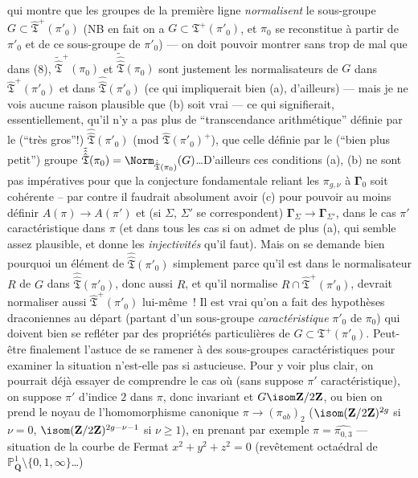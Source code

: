qui montre que les groupes de la première ligne \emph{normalisent} le sous-groupe $G\subset \hat{\mathfrak{T}}^+(\pi'_0)$ (NB en fait on a $G\subset \mathfrak{T}^+(\pi'_0)$, et $\pi_0$ se reconstitue à partir de $\pi'_0$ et de ce sous-groupe de $\pi'_0$) --- on doit pouvoir montrer sans trop de mal que dans (8), $\tilde{\hat{\mathfrak{T}}}^+(\pi_0)$ et  $\tilde{\hat{\hat{\mathfrak{T}}}}(\pi_0)$ sont justement les normalisateurs de $G$ dans $\hat{\mathfrak{T}}^+(\pi'_0)$ et dans $\hat{\hat{\mathfrak{T}}}(\pi'_0)$ (ce qui impliquerait bien (a), d'ailleurs) --- mais je ne vois aucune raison plausible que (b) soit vrai --- ce qui signifierait, essentiellement, qu'il n'y a pas plus de ``transcendance arithmétique'' définie par le (``très gros''!) $\hat{\hat{\mathfrak{T}}}(\pi'_0)$ (mod $\hat{\mathfrak{T}}(\pi'_0)^+$), que celle définie par le (``bien plus petit'') groupe $\tilde{\hat{\hat{\mathfrak{T}}}}(\pi_0)={\Norm}_{\hat{\hat{\mathfrak{T}}}(\pi_0)}(G)$\dots D'ailleurs ces conditions (a), (b) ne sont pas impératives pour que la conjecture fondamentale reliant les $\pi_{g,\nu}$ à $\boldsymbol{\Gamma}_0$ soit cohérente -- par contre il faudrait absolument avoir (c) pour pouvoir au moins définir $A(\pi)\to A(\pi')$ et (si $\Sigma$, $\Sigma'$ se correspondent) $\boldsymbol{\Gamma}_\Sigma\to\boldsymbol{\Gamma}_{\Sigma'}$, dans le cas $\pi'$ caractéristique dans $\pi$ (et dans tous les cas si on admet de plus (a), qui semble assez plausible, et donne les \emph{injectivités} qu'il faut). Mais on se demande bien pourquoi un élément de $\hat{\hat{\mathfrak{T}}}(\pi'_0)$ simplement parce qu'il est dans le normalisateur $R$ de $G$ dans $\hat{\hat{\mathfrak{T}}}(\pi'_0)$, donc aussi $R$, et qu'il normalise $R\cap\hat{\mathfrak{T}}^+(\pi'_0)$, devrait normaliser aussi $\hat{\mathfrak{T}}^+(\pi'_0)$ lui-même~! Il est vrai qu'on a fait des hypothèses draconiennes au départ (partant d'un sous-groupe \emph{caractéristique} $\pi'_0$ de $\pi_0$) qui doivent bien se refléter par des propriétés particulières de $G\subset \mathfrak{T}^+(\pi'_0)$. Peut-être finalement l'astuce de se ramener à des sous-groupes caractéristiques pour examiner la situation n'est-elle pas si astucieuse. Pour y voir plus clair, on pourrait déjà essayer de comprendre le cas où (sans suppose $\pi'$ caractéristique), on suppose $\pi'$ d'indice $2$ dans $\pi$, donc invariant et $G \isom \mathbf{Z}/2\mathbf{Z}$, ou bien on prend le noyau de l'homomorphisme canonique $\pi\to(\pi_{ab})_2$ ($ \isom (\mathbf{Z}/2\mathbf{Z})^{2g}$ si $\nu=0$, $ \isom (\mathbf{Z}/2\mathbf{Z})^{2g-\nu-1}$ si $\nu\ge 1$), en prenant par exemple $\pi=\hat{\pi_{0,3}}$ --- situation de la courbe de Fermat $x^2+y^2+z^2=0$ (revêtement octaédral de $\mathbb{P}^1_{\overline{\mathbf{Q}}} \setminus\{0,1,\infty\}$\dots)
 
